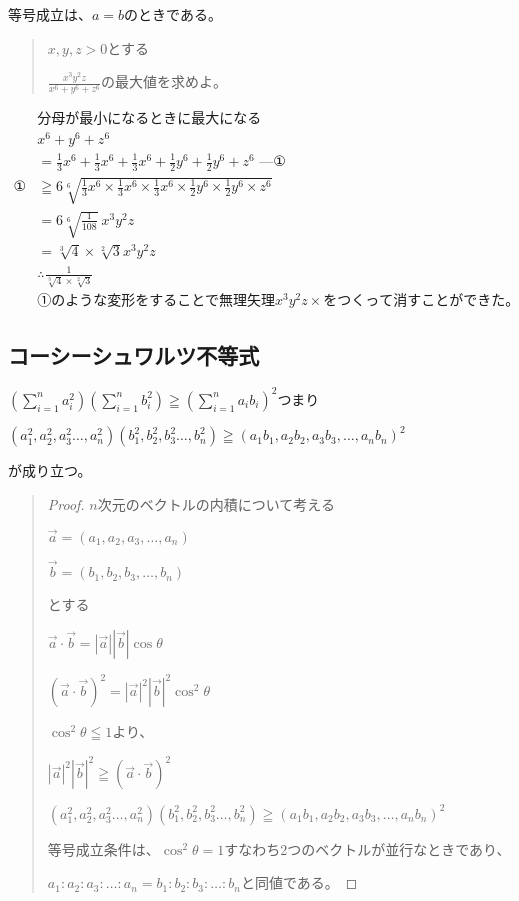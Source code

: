 \documentclass[uplatex,fleqn]{jsbook}
\begin{document}
等号成立は、$a=b$のときである。

\begin{quote}
    $x,y,z>0$とする

    $\displaystyle \frac{x^3y^2z}{x^6+y^6+z^6}$の最大値を求めよ。
\end{quote}

\begin{align*}
    &\text{分母が最小になるときに最大になる}\\
    &x^6+y^6+z^6\\
    &=\frac{1}{3}x^6+\frac{1}{3}x^6+\frac{1}{3}x^6+\frac{1}{2}y^6+\frac{1}{2}y^6+z^6\text{ ---①}\\
    \text{①}&\geqq6\sqrt[6]{\frac{1}{3}x^6\times\frac{1}{3}x^6\times\frac{1}{3}x^6\times\frac{1}{2}y^6\times\frac{1}{2}y^6\times z^6}\\
    &=6\sqrt[6]{\frac{1}{108}}\ x^3y^2z\\
    &=\sqrt[3]{4}\times\sqrt[2]{3}x^3y^2z\\
    &\therefore \frac{1}{\sqrt[3]{4}\times\sqrt[2]{3}}\\
    &\text{①のような変形をすることで無理矢理}x^3y^2z\times{をつくって消すことができた。}
\end{align*}

\subsection{コーシーシュワルツ不等式}
$\displaystyle (\sum_{i=1}^n a^2_i)(\sum_{i=1}^n b^2_i)\geqq(\sum_{i=1}^n a_ib_i)^2$つまり

$(a^2_1,a^2_2,a^2_3\dots,a^2_n)(b^2_1,b^2_2,b^2_3\dots,b^2_n)\geqq(a_1b_1,a_2b_2,a_3b_3,\dots,a_nb_n)^2$

が成り立つ。
\begin{quote}
    \begin{proof}
        $n$次元のベクトルの内積について考える

        $\vec{a}=(a_1,a_2,a_3,\dots,a_n)$

        $\vec{b}=(b_1,b_2,b_3,\dots,b_n)$

        とする

        $\vec{a}\cdot\vec{b}=|\vec{a}||\vec{b}|\cos\theta$

        $(\vec{a}\cdot\vec{b})^2=|\vec{a}|^2|\vec{b}|^2\cos^2\theta$

        $\cos^2\theta\leqq1$より、

        $|\vec{a}|^2|\vec{b}|^2\geqq(\vec{a}\cdot\vec{b})^2$

        $(a^2_1,a^2_2,a^2_3\dots,a^2_n)(b^2_1,b^2_2,b^2_3\dots,b^2_n)\geqq(a_1b_1,a_2b_2,a_3b_3,\dots,a_nb_n)^2$

        等号成立条件は、$\cos^2\theta=1$すなわち2つのベクトルが並行なときであり、

        $a_1:a_2:a_3:\dots:a_n=b_1:b_2:b_3:\dots:b_n$と同値である。
    \end{proof}
\end{quote}
\end{document}
